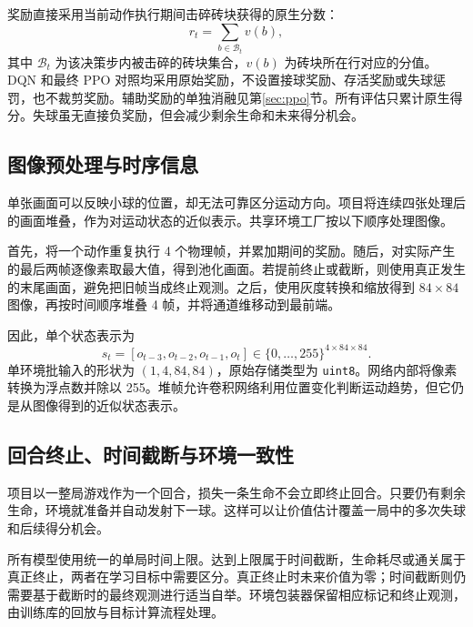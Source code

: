 奖励直接采用当前动作执行期间击碎砖块获得的原生分数：
\begin{equation}
 r_t=\sum_{b\in\mathcal B_t}v(b),
\end{equation}
其中 $\mathcal B_t$ 为该决策步内被击碎的砖块集合，$v(b)$ 为砖块所在行对应的分值。DQN 和最终 PPO 对照均采用原始奖励，不设置接球奖励、存活奖励或失球惩罚，也不裁剪奖励。辅助奖励的单独消融见第\ref{sec:ppo}节。所有评估只累计原生得分。失球虽无直接负奖励，但会减少剩余生命和未来得分机会。

\subsection{图像预处理与时序信息}
单张画面可以反映小球的位置，却无法可靠区分运动方向。项目将连续四张处理后的画面堆叠，作为对运动状态的近似表示。共享环境工厂按以下顺序处理图像。

首先，将一个动作重复执行 4 个物理帧，并累加期间的奖励。随后，对实际产生的最后两帧逐像素取最大值，得到池化画面。若提前终止或截断，则使用真正发生的末尾画面，避免把旧帧当成终止观测。之后，使用灰度转换和缩放得到 $84\times84$ 图像，再按时间顺序堆叠 4 帧，并将通道维移动到最前端。

因此，单个状态表示为
\begin{equation}
 s_t=[o_{t-3},o_{t-2},o_{t-1},o_t]
 \in\{0,\ldots,255\}^{4\times84\times84}.
\end{equation}
单环境批输入的形状为 $(1,4,84,84)$，原始存储类型为 \texttt{uint8}。网络内部将像素转换为浮点数并除以 255。堆帧允许卷积网络利用位置变化判断运动趋势，但它仍是从图像得到的近似状态表示。


\subsection{回合终止、时间截断与环境一致性}
项目以一整局游戏作为一个回合，损失一条生命不会立即终止回合。只要仍有剩余生命，环境就准备并自动发射下一球。这样可以让价值估计覆盖一局中的多次失球和后续得分机会。

所有模型使用统一的单局时间上限。达到上限属于时间截断，生命耗尽或通关属于真正终止，两者在学习目标中需要区分。真正终止时未来价值为零；时间截断则仍需要基于截断时的最终观测进行适当自举。环境包装器保留相应标记和终止观测，由训练库的回放与目标计算流程处理。

